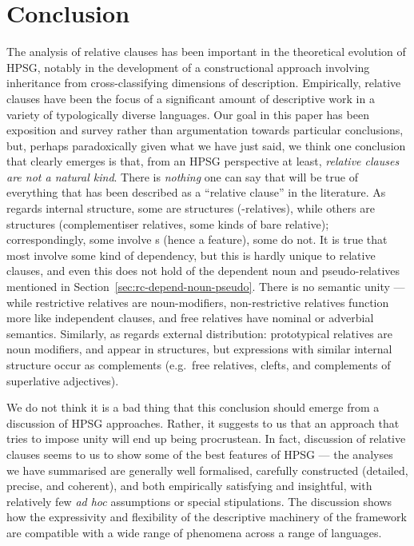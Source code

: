 \documentclass[output=paper,biblatex,babelshorthands,newtxmath,draftmode,colorlinks,citecolor=brown]{langscibook}
\begin{document}
\section{Conclusion}
\label{sec:rc-conclusion}

The analysis of relative clauses has been important in the theoretical evolution of HPSG,
notably in the development of a constructional approach involving inheritance from cross-classifying
dimensions of description. Empirically, relative clauses have been the focus
of a significant amount of descriptive work in a variety of typologically diverse
languages. Our goal in this paper has been exposition and survey rather than argumentation
towards particular conclusions, but, perhaps paradoxically given what we have just said, we
think one conclusion that clearly emerges is that, from an HPSG perspective at least,
\emph{relative clauses are not a natural kind}.
There is \emph{nothing} one can
say that will be true of everything that has been  described as a ``relative clause'' in
the literature. As
regards internal structure, some are  structures (-relatives),
while others are  structures (complementiser relatives, some kinds of
bare relative); correspondingly, some involve s (hence a 
feature), some do not. It is true that most involve some kind of 
dependency, but this is hardly unique to relative clauses, and even this does not hold of
the dependent noun and pseudo-relatives mentioned in
Section~\ref{sec:rc-depend-noun-pseudo}. There is no semantic unity --- while restrictive
relatives are noun-modifiers, non-restrictive relatives function more like independent clauses, and
free relatives have nominal or adverbial semantics. Similarly, as regards external distribution: prototypical
relatives are noun modifiers, and appear in
 structures, but
expressions with similar internal structure occur as complements (e.g.\ free
relatives, clefts, and complements of superlative adjectives).

We do not think it is a bad thing that this conclusion should emerge from a discussion of HPSG
approaches. Rather, it suggests to us that an approach that tries to impose unity will end
up being procrustean. In fact, discussion of relative clauses seems to us to show some of
the best features of HPSG --- the analyses we have summarised are generally well
formalised, carefully constructed (detailed, precise, and coherent), and both empirically
satisfying and insightful, with relatively few \emph{ad hoc} assumptions or special
stipulations. The discussion shows how the expressivity and flexibility of the descriptive
machinery of the framework are compatible with a wide range of phenomena across a range of
languages.
\end{document}
